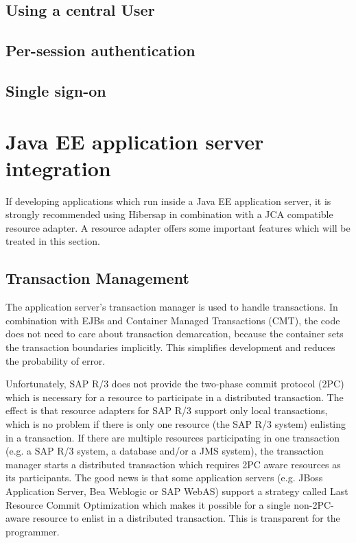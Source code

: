 \subsection{Using a central User}

\subsection{Per-session authentication}

\subsection{Single sign-on}


\section{Java EE application server integration}
If developing applications which run inside a Java EE application server, it is strongly recommended using Hibersap in combination with a JCA compatible resource adapter. A resource adapter offers some important features which will be treated in this section.

\subsection{Transaction Management} 
The application server's transaction manager is used to handle transactions. In combination with EJBs and Container Managed Transactions (CMT), the code does not need to care about transaction demarcation, because the container sets the transaction boundaries implicitly. This simplifies development and reduces the probability of error. 

Unfortunately, SAP R/3 does not provide the two-phase commit protocol (2PC) which is necessary for a resource to participate in a distributed transaction. The effect is that resource adapters for SAP R/3 support only local transactions, which is no problem if there is only one resource (the SAP R/3 system) enlisting in a transaction. If there are multiple resources participating in one transaction (e.g. a SAP R/3 system, a database and/or a JMS system), the transaction manager starts a distributed transaction which requires 2PC aware resources as its participants. The good news is that some application servers (e.g. JBoss Application Server, Bea Weblogic or SAP WebAS) support a strategy called Last Resource Commit Optimization which makes it possible for a single non-2PC-aware resource to enlist in a distributed transaction. This is transparent for the programmer.

